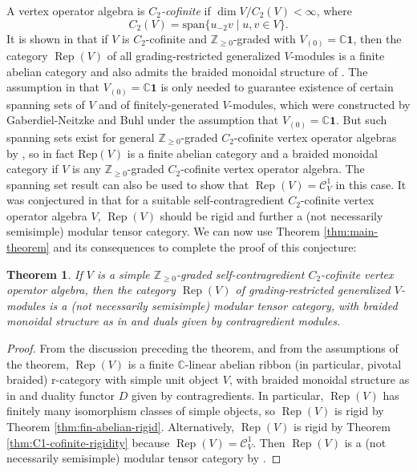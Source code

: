 \documentclass[11pt, reqno]{amsart}
\newtheorem{thm}{Theorem}[section]
\theoremstyle{definition}\newtheorem{defi}[thm]{Definition}
\theoremstyle{definition}\newtheorem{rem}[thm]{Remark}
\theoremstyle{definition}\newtheorem{exam}[thm]{Example}
\theoremstyle{definition}\newtheorem{assum}[thm]{Assumption}
\newcommand{\cC}{\mathcal{C}}
\newcommand{\CC}{\mathbb{C}}
\newcommand{\ZZ}{\mathbb{Z}}
\newcommand{\vac}{\mathbf{1}}
\DeclareMathOperator{\rep}{Rep}
\begin{document}
A vertex operator algebra is \textit{$C_2$-cofinite} if $\dim V/C_2(V) <\infty$, where 
\begin{equation*}
C_2(V) =\mathrm{span}\lbrace u_{-2}v\mid u,v\in V\rbrace.
\end{equation*}
It is shown in \cite{Hu-C2} that if $V$ is $C_2$-cofinite and $\ZZ_{\geq 0}$-graded with $V_{(0)}=\CC\vac$, then the category $\rep(V)$ of all grading-restricted generalized $V$-modules is a finite abelian category and also admits the braided monoidal structure of \cite{HLZ8}. The assumption in \cite{Hu-C2} that $V_{(0)}=\CC\vac$ is only needed to guarantee existence of certain spanning sets of $V$ and of finitely-generated $V$-modules, which were constructed by Gaberdiel-Neitzke \cite{GN} and Buhl \cite{Bu} under the assumption that $V_{(0)}=\CC\vac$. But such spanning sets exist for general $\ZZ_{\geq 0}$-graded $C_2$-cofinite vertex operator algebras by \cite[Lemma 2.4]{Mi-C2}, so in fact $\mathrm{Rep}(V)$ is a finite abelian category and a braided monoidal category if $V$ is any $\ZZ_{\geq 0}$-graded $C_2$-cofinite vertex operator algebra. The spanning set result \cite[Lemma 2.4]{Mi-C2} can also be used to show that $\rep(V)=\cC_V^1$ in this case. It was conjectured in \cite{Hu-conj} that for a suitable self-contragredient $C_2$-cofinite vertex operator algebra $V$, $\rep(V)$ should be rigid and further a (not necessarily semisimple) modular tensor category. We can now use Theorem \ref{thm:main-theorem} and its consequences to complete the proof of this conjecture:
\begin{thm}\label{thm:C2-cofinite-rigidity}
If $V$ is a simple $\ZZ_{\geq 0}$-graded self-contragredient $C_2$-cofinite vertex operator algebra, then the category $\rep(V)$ of grading-restricted generalized $V$-modules is a (not necessarily semisimple) modular tensor category, with braided monoidal structure as in \cite{HLZ8} and duals given by contragredient modules.
\end{thm}
\begin{proof}
From the discussion preceding the theorem, and from the assumptions of the theorem, $\rep(V)$ is a finite $\CC$-linear abelian ribbon (in particular, pivotal braided) r-category with simple unit object $V$, with braided monoidal structure as in \cite{HLZ8} and duality functor $D$ given by contragredients. In particular, $\rep(V)$ has finitely many isomorphism classes of simple objects, so $\rep(V)$ is rigid by Theorem \ref{thm:fin-abelian-rigid}. Alternatively, $\rep(V)$ is rigid by Theorem \ref{thm:C1-cofinite-rigidity} because $\rep(V)=\cC_V^1$. Then $\rep(V)$ is a (not necessarily semisimple) modular tensor category by \cite[Main Theorem 1]{McR}.
\end{proof}
\end{document}
